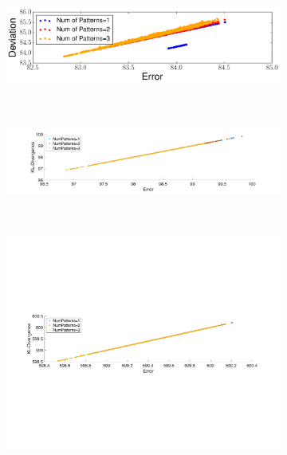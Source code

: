 \begin{figure}[h!]
\begin{subfigure}[b]{0.485\textwidth}
        \centering
        \includegraphics[width=\textwidth]{QueryLogSummarization/graphics/ErrorCapturesDeviation_PocketData.pdf}
        \label{fig:errorcapturesdeviation_pocketdata}
    \end{subfigure}
    ~
     \begin{subfigure}[b]{0.45\textwidth}
        \centering
        \includegraphics[width=\textwidth]{QueryLogSummarization/graphics/ErrorCapturesKL_BankData.pdf}
        \label{fig:errorcapturesKL_bankdata}
\end{subfigure}
    ~
     \begin{subfigure}[b]{0.45\textwidth}
        \centering
        \includegraphics[width=\textwidth]{QueryLogSummarization/graphics/ErrorCapturesKL_PocketData.pdf}

\end{subfigure}
\end{figure}
